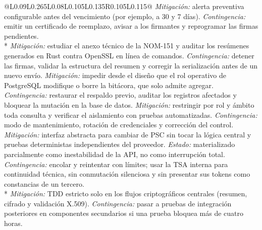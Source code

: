 {\begin{longtable}{@{}L{0.09\linewidth}L{0.265\linewidth}L{0.08\linewidth}L{0.105\linewidth}L{0.135\linewidth}R{0.105\linewidth}L{0.115\linewidth}@{}}
    {\textit{Mitigación:} alerta preventiva configurable antes del vencimiento (por ejemplo, a 30 y 7 días). \textit{Contingencia:} emitir un certificado de reemplazo, avisar a los firmantes y reprogramar las firmas pendientes.}
   \\* \addlinespace[2pt]
    {\textit{Mitigación:} estudiar el anexo técnico de la NOM-151 y auditar los resúmenes generados en Rust contra OpenSSL en línea de comandos. \textit{Contingencia:} detener las firmas, validar la estructura del resumen y corregir la serialización antes de un nuevo envío.}
    {\textit{Mitigación:} impedir desde el diseño que el rol operativo de PostgreSQL modifique o borre la bitácora, que solo admite agregar. \textit{Contingencia:} restaurar el respaldo previo, auditar los registros afectados y bloquear la mutación en la base de datos.}
    {\textit{Mitigación:} restringir por rol y ámbito toda consulta y verificar el aislamiento con pruebas automatizadas. \textit{Contingencia:} modo de mantenimiento, rotación de credenciales y corrección del control.}
    {\textit{Mitigación:} interfaz abstracta para cambiar de PSC sin tocar la lógica central y pruebas deterministas independientes del proveedor. \textit{Estado:} materializado parcialmente como inestabilidad de la API, no como interrupción total. \textit{Contingencia:} encolar y reintentar con límites; usar la TSA interna para continuidad técnica, sin conmutación silenciosa y sin presentar sus tokens como constancias de un tercero.}
   \\* \addlinespace[2pt]
    {\textit{Mitigación:} TDD estricto solo en los flujos criptográficos centrales (resumen, cifrado y validación X.509). \textit{Contingencia:} pasar a pruebas de integración posteriores en componentes secundarios si una prueba bloquea más de cuatro horas.}

\end{longtable}}

